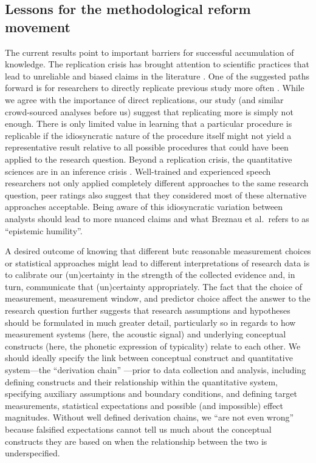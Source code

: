 \documentclass[Review,times,sageh]{sagej}
\begin{document}
\hypertarget{lessons-for-the-methodological-reform-movement}{%
\subsection{Lessons for the methodological reform movement}\label{lessons-for-the-methodological-reform-movement}}

The current results point to important barriers for successful accumulation of knowledge.
The replication crisis has brought attention to scientific practices that lead to unreliable and biased claims in the literature \citep[e.g.,][\citet{fidler2018reproducibility}]{vazire2017quality}.
One of the suggested paths forward is for researchers to directly replicate previous study more often \citep[e.g.,][]{open2015estimating, camerer2018evaluating}.
While we agree with the importance of direct replications, our study (and similar crowd-sourced analyses before us) suggest that replicating more is simply not enough.
There is only limited value in learning that a particular procedure is replicable if the idiosyncratic nature of the procedure itself might not yield a representative result relative to all possible procedures that could have been applied to the research question.
Beyond a replication crisis, the quantitative sciences are in an inference crisis \citep{rotello2015more, starns2019assessing}.
Well-trained and experienced speech researchers not only applied completely different approaches to the same research question, peer ratings also suggest that they considered most of these alternative approaches acceptable.
Being aware of this idiosyncratic variation between analysts should lead to more nuanced claims and what Breznau et al.~refers to as ``epistemic humility''.

A desired outcome of knowing that different butc reasonable measurement choices or statistical approaches might lead to different interpretations of research data is to calibrate our (un)certainty in the strength of the collected evidence and, in turn, communicate that (un)certainty appropriately.
The fact that the choice of measurement, measurement window, and predictor choice affect the answer to the research question further suggests that research assumptions and hypotheses should be formulated in much greater detail, particularly so in regards to how measurement systems (here, the acoustic signal) and underlying conceptual constructs (here, the phonetic expression of typicality) relate to each other.
We should ideally specify the link between conceptual construct and quantitative system---the ``derivation chain'' \citep{dubin1970theory, meehl1990summaries}---prior to data collection and analysis, including defining constructs and their relationship within the quantitative system, specifying auxiliary assumptions and boundary conditions, and defining target measurements, statistical expectations and possible (and impossible) effect magnitudes.
Without well defined derivation chains, we ``are not even wrong'' \citep{scheel2022most} because falsified expectations cannot tell us much about the conceptual constructs they are based on when the relationship between the two is underspecified.
\end{document}
